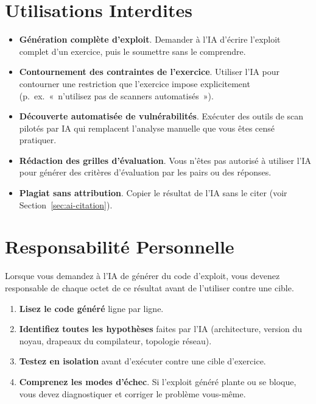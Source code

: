 \section{Utilisations Interdites}

\begin{itemize}
  \item \textbf{Génération complète d'exploit}. Demander à l'IA
        d'écrire l'exploit complet d'un exercice, puis le soumettre
        sans le comprendre.
  \item \textbf{Contournement des contraintes de l'exercice}. Utiliser
        l'IA pour contourner une restriction que l'exercice impose
        explicitement (p.\ ex.\ «~n'utilisez pas de scanners
        automatisés~»).
  \item \textbf{Découverte automatisée de vulnérabilités}. Exécuter des
        outils de scan pilotés par IA qui remplacent l'analyse manuelle
        que vous êtes censé pratiquer.
  \item \textbf{Rédaction des grilles d'évaluation}. Vous n'êtes pas
        autorisé à utiliser l'IA pour générer des critères d'évaluation
        par les pairs ou des réponses.
  \item \textbf{Plagiat sans attribution}. Copier le résultat de l'IA
        sans le citer (voir Section~\ref{sec:ai-citation}).
\end{itemize}

\section{Responsabilité Personnelle}

Lorsque vous demandez à l'IA de générer du code d'exploit, vous
devenez responsable de chaque octet de ce résultat avant de
l'utiliser contre une cible.

\begin{enumerate}
  \item \textbf{Lisez le code généré} ligne par ligne.
  \item \textbf{Identifiez toutes les hypothèses} faites par l'IA
        (architecture, version du noyau, drapeaux du compilateur,
        topologie réseau).
  \item \textbf{Testez en isolation} avant d'exécuter contre une
        cible d'exercice.
  \item \textbf{Comprenez les modes d'échec}. Si l'exploit généré
        plante ou se bloque, vous devez diagnostiquer et corriger
        le problème vous-même.
\end{enumerate}

